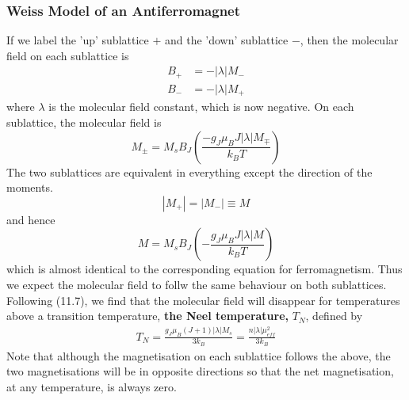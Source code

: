 \documentclass[a4paper, 11pt, normalem]{report}
\begin{document}
\subsection{Weiss Model of an Antiferromagnet}
If we label the 'up' sublattice $+$ and the 'down' sublattice $-$, then the molecular field on each sublattice is
\begin{align}
    B_+ &= -|\lambda|M_- \\
    B_- &= -|\lambda|M_+ 
\end{align}
where $\lambda$ is the molecular field constant, which is now negative.
On each sublattice, the molecular field is
\begin{equation}
    M_\pm = M_sB_J\left(\frac{-g_J\mu_B J|\lambda|M_\mp}{k_BT}\right)
\end{equation}
The two sublattices are equivalent in everything except the direction of the moments.
\begin{equation}
    |M_+| = |M_-| \equiv M
\end{equation}
and hence 
\begin{equation}
    M = M_sB_J \left(-\frac{g_J\mu_B J|\lambda|M}{k_BT}\right)
\end{equation}
which is almost identical to the corresponding equation for ferromagnetism.
Thus we expect the molecular field to follw the same behaviour on both sublattices.
Following (11.7), we find that the molecular field will disappear for temperatures above a transition temperature, \textbf{the Neel temperature,} $T_N$, defined by
\begin{align}
    T_N = \frac{g_J\mu_B(J+1)|\lambda|M_s}{3k_B} = \frac{n|\lambda|\mu^2_{eff}}{3k_B}
\end{align}
Note that although the magnetisation on each sublattice follows the above, the two magnetisations will be in opposite directions so that the net magnetisation, at any temperature, is always zero.

\chapter{}
\end{document}
